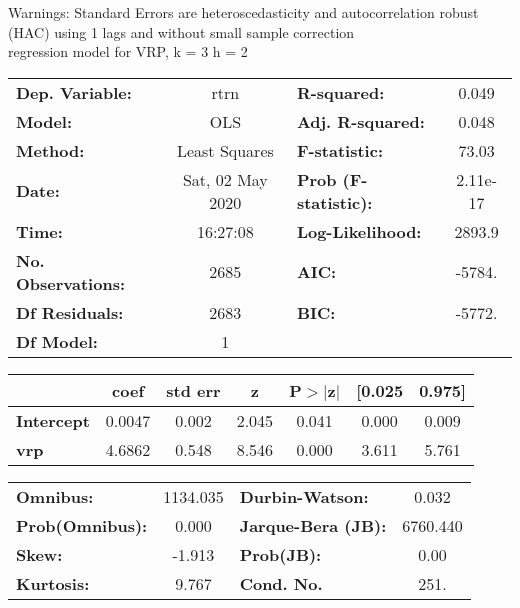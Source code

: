 Warnings: \newline
 [1] Standard Errors are heteroscedasticity and autocorrelation robust (HAC) using 1 lags and without small sample correction\\ 

regression model for VRP, k = 3 h = 2\begin{center}
\begin{tabular}{lclc}
\toprule
\textbf{Dep. Variable:}    &       rtrn       & \textbf{  R-squared:         } &     0.049   \\
\textbf{Model:}            &       OLS        & \textbf{  Adj. R-squared:    } &     0.048   \\
\textbf{Method:}           &  Least Squares   & \textbf{  F-statistic:       } &     73.03   \\
\textbf{Date:}             & Sat, 02 May 2020 & \textbf{  Prob (F-statistic):} &  2.11e-17   \\
\textbf{Time:}             &     16:27:08     & \textbf{  Log-Likelihood:    } &    2893.9   \\
\textbf{No. Observations:} &        2685      & \textbf{  AIC:               } &    -5784.   \\
\textbf{Df Residuals:}     &        2683      & \textbf{  BIC:               } &    -5772.   \\
\textbf{Df Model:}         &           1      & \textbf{                     } &             \\
\bottomrule
\end{tabular}
\begin{tabular}{lcccccc}
                   & \textbf{coef} & \textbf{std err} & \textbf{z} & \textbf{P$> |$z$|$} & \textbf{[0.025} & \textbf{0.975]}  \\
\midrule
\textbf{Intercept} &       0.0047  &        0.002     &     2.045  &         0.041        &        0.000    &        0.009     \\
\textbf{vrp}       &       4.6862  &        0.548     &     8.546  &         0.000        &        3.611    &        5.761     \\
\bottomrule
\end{tabular}
\begin{tabular}{lclc}
\textbf{Omnibus:}       & 1134.035 & \textbf{  Durbin-Watson:     } &    0.032  \\
\textbf{Prob(Omnibus):} &   0.000  & \textbf{  Jarque-Bera (JB):  } & 6760.440  \\
\textbf{Skew:}          &  -1.913  & \textbf{  Prob(JB):          } &     0.00  \\
\textbf{Kurtosis:}      &   9.767  & \textbf{  Cond. No.          } &     251.  \\
\bottomrule
\end{tabular}
\end{center}

